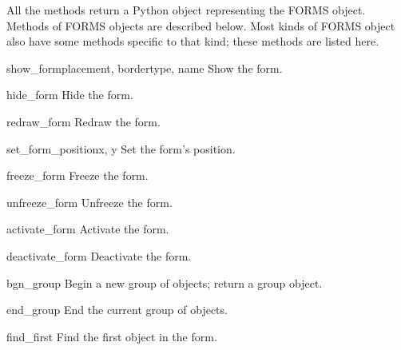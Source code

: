 All the  methods return a Python object representing
the FORMS object.  Methods of FORMS objects are described below.  Most
kinds of FORMS object also have some methods specific to that kind;
these methods are listed here.

\begin{flushleft}

\begin{methoddesc}[form]{show_form}{placement, bordertype, name}
  Show the form.
\end{methoddesc}

\begin{methoddesc}[form]{hide_form}{}
  Hide the form.
\end{methoddesc}

\begin{methoddesc}[form]{redraw_form}{}
  Redraw the form.
\end{methoddesc}

\begin{methoddesc}[form]{set_form_position}{x, y}
Set the form's position.
\end{methoddesc}

\begin{methoddesc}[form]{freeze_form}{}
Freeze the form.
\end{methoddesc}

\begin{methoddesc}[form]{unfreeze_form}{}
  Unfreeze the form.
\end{methoddesc}

\begin{methoddesc}[form]{activate_form}{}
  Activate the form.
\end{methoddesc}

\begin{methoddesc}[form]{deactivate_form}{}
  Deactivate the form.
\end{methoddesc}

\begin{methoddesc}[form]{bgn_group}{}
  Begin a new group of objects; return a group object.
\end{methoddesc}

\begin{methoddesc}[form]{end_group}{}
  End the current group of objects.
\end{methoddesc}

\begin{methoddesc}[form]{find_first}{}
  Find the first object in the form.
\end{methoddesc}


\end{flushleft}
